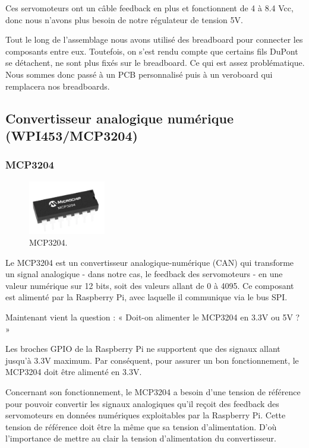 \documentclass[a4paper,12pt]{report}  %
\begin{document}
Ces servomoteurs ont un câble feedback en plus et fonctionnent de 4 à 8.4 Vcc, donc nous n’avons plus besoin de notre régulateur de tension 5V. 

Tout le long de l’assemblage nous avons utilisé des breadboard pour connecter les composants entre eux. Toutefois, on s’est rendu compte que certains fils DuPont se détachent, ne sont plus fixés sur le breadboard. Ce qui est assez problématique. 
Nous sommes donc passé à un PCB personnalisé puis à un veroboard qui remplacera nos breadboards.


\subsection{Convertisseur analogique numérique (WPI453/MCP3204)}

\subsubsection{MCP3204}
\begin{figure}[H]
	\centering
	\includegraphics[width=0.3\textwidth]{./attachments/MCP3204.png}
	\caption{MCP3204.}
\end{figure}

Le MCP3204 est un convertisseur analogique-numérique (CAN) qui transforme un signal analogique - dans notre cas, le feedback des servomoteurs - en une valeur numérique sur 12 bits, soit des valeurs allant de 0 à 4095. Ce composant est alimenté par la Raspberry Pi, avec laquelle il communique via le bus SPI. 

Maintenant vient la question : « Doit-on alimenter le MCP3204 en 3.3V ou 5V ? » 

Les broches GPIO de la Raspberry Pi ne supportent que des signaux allant jusqu’à 3.3V maximum. Par conséquent, pour assurer un bon fonctionnement, le MCP3204 doit être alimenté en 3.3V. 

Concernant son fonctionnement, le MCP3204 a besoin d’une tension de référence pour pouvoir convertir les signaux analogiques qu’il reçoit des feedback des servomoteurs en données numériques exploitables par la Raspberry Pi. Cette tension de référence doit être la même que sa tension d’alimentation. D’où l’importance de mettre au clair la tension d’alimentation du convertisseur.  
\end{document}

